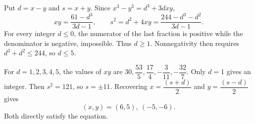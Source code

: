 Put $d=x-y$ and $s=x+y$. Since $x^3-y^3=d^3+3dxy$,
\[
xy=\dfrac{61-d^3}{3d-1},\qquad
s^2=d^2+4xy=\dfrac{244-d^3-d^2}{3d-1}.
\]
For every integer $d\le0$, the numerator of the last fraction is positive while the denominator is negative, impossible. Thus $d\ge1$. Nonnegativity then requires $d^3+d^2\le244$, so $d\le5$.

For $d=1,2,3,4,5$, the values of $xy$ are $30,\dfrac{53}{5},\dfrac{17}{4},-\dfrac{3}{11},-\dfrac{32}{7}$. Only $d=1$ gives an integer. Then $s^2=121$, so $s=\pm11$. Recovering $x=\dfrac{(s+d)}{2}$ and $y=\dfrac{(s-d)}{2}$ gives
\[
\boxed{(x,y)=(6,5),\ (-5,-6)}.
\]
Both directly satisfy the equation.

